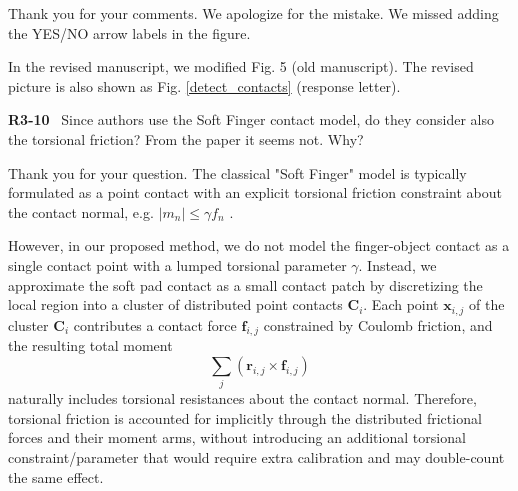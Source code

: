 \documentclass[journal]{IEEEtran}
\newcommand{\chen}[1]{{\color{blue}\begin{CJK*}{UTF8}{gkai}#1\end{CJK*}}}
\begin{document}
Thank you for your comments. We apologize for the mistake. We missed adding the YES/NO arrow labels in the figure.

In the revised manuscript, we modified Fig. 5 (old manuscript). The revised picture is also shown as Fig. \ref{detect_contacts} (response letter).
\bigskip

\noindent
{\textbf{\color{black}R3-10}\color{gray}~
Since authors use the Soft Finger contact model, do they consider also the torsional friction? From the paper it seems not. Why?
}


Thank you for your question. 
The classical "Soft Finger" model is typically formulated as a point contact with an explicit torsional friction constraint about the contact normal, e.g. $|m_n|\leq \gamma f_n$ \cite{murray1994mathematical}. 

However, in our proposed method, we do not model the finger-object contact as a single contact point with a lumped torsional parameter $\gamma$. Instead, we approximate the soft pad contact as a small contact patch by discretizing the local region into a cluster of distributed point contacts $\mathbf{C}_i$.
Each point $\mathbf{x}_{i,j}$ of the cluster $\mathbf{C}_i$ contributes a contact force $\mathbf{f}_{i,j}$ constrained by Coulomb friction, and the resulting total moment
\begin{equation}
\sum_{j}(\mathbf{r}_{i,j}\times \mathbf{f}_{i,j})
\end{equation} 
naturally includes torsional resistances about the contact normal. Therefore, torsional friction is accounted for implicitly through the distributed frictional forces and their moment arms, without introducing an additional torsional constraint/parameter that would require extra calibration and may double-count the same effect.
 
\end{document}
